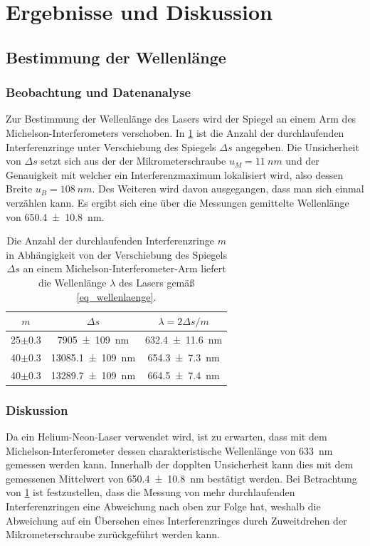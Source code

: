 \documentclass[
	a4paper,
	12pt,
	pagesize,
	ngerman
]{scrartcl}
\begin{document}
	\section{Ergebnisse und Diskussion}


	\subsection{Bestimmung der Wellenlänge}
	\subsubsection{Beobachtung und Datenanalyse}
	Zur Bestimmung der Wellenlänge des Lasers wird der Spiegel an einem Arm des Michelson-Interferometers verschoben.
	In \cref{tb_lambda} ist die Anzahl der durchlaufenden Interferenzringe unter Verschiebung des Spiegels $\Delta s$ angegeben.
	Die Unsicherheit von $\Delta s$ setzt sich aus der der Mikrometerschraube $u_M=\SI{11}{nm}$ und der Genauigkeit mit welcher ein Interferenzmaximum lokalisiert wird, also dessen Breite $u_B=\SI{108}{nm}$. %
	Des Weiteren wird davon ausgegangen, dass man sich einmal verzählen kann.
	Es ergibt sich eine über die Messungen gemittelte Wellenlänge von \SI{650.4+-10.8}{nm}.

	\begin{table}[H]
		\centering
		\begin{tabular}{| c | c | c |}
			\hline
			  $m$ &  $\Delta s$ & $\lambda=2 \Delta s/m$\\ \hline
				25$\pm$0.3 & \SI{7905+-109}{nm} & \SI{632.4+-11.6}{nm}\\
				40$\pm$0.3& \SI{13085.1+-109}{nm} & \SI{654.3+-7.3}{nm}\\
				40$\pm$0.3& \SI{13289.7+-109}{nm} & \SI{664.5+-7.4}{nm}\\
				\hline
		\end{tabular}
		\caption{Die Anzahl der durchlaufenden Interferenzringe $m$ in Abhängigkeit von der Verschiebung des Spiegels $\Delta s$ an einem Michelson-Interferometer-Arm liefert die Wellenlänge $\lambda$ des Lasers gemäß \cref{eq_wellenlaenge}. }
		\label{tb_lambda}
	\end{table}

	\subsubsection{Diskussion}
	Da ein Helium-Neon-Laser verwendet wird, ist zu erwarten, dass mit dem Michelson-Interferometer dessen charakteristische Wellenlänge von \SI{633}{nm} gemessen werden kann.
	Innerhalb der dopplten Unsicherheit kann dies mit dem gemessenen Mittelwert von \SI{650,4\pm 10,8}{nm} bestätigt werden.
	Bei Betrachtung von \cref{tb_lambda} ist festzustellen, dass die Messung von mehr durchlaufenden Interferenzringen eine Abweichung nach oben zur Folge hat, weshalb die Abweichung auf ein Übersehen eines Interferenzringes durch Zuweitdrehen der Mikrometerschraube zurückgeführt werden kann.
\end{document}
